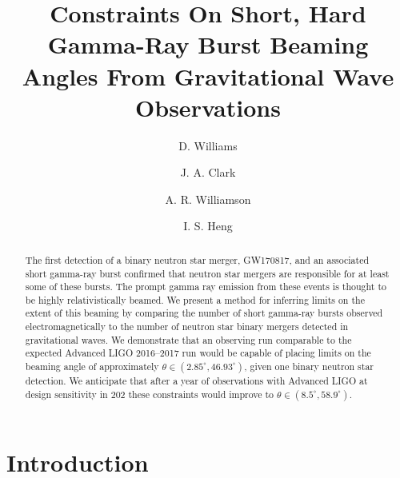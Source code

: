 \documentclass[twocolumn]{aastex61}
\begin{document}
\title{Constraints On Short, Hard Gamma-Ray Burst Beaming Angles From
Gravitational Wave Observations}

\author[0000-0003-3772-198X]{D. Williams}
\author[0000-0003-3243-1393]{J. A. Clark}
\author[0000-0002-7627-8688]{A. R. Williamson}
\author[0000-0002-1977-0019]{I. S. Heng}





\begin{abstract}
The first detection of a binary neutron star merger, GW170817, and an associated
short gamma-ray burst confirmed that neutron star mergers are responsible for at
least some of these bursts. The prompt gamma ray emission from these events is
thought to be highly relativistically beamed. We present a method for inferring
limits on the extent of this beaming by comparing the number of short gamma-ray
bursts observed electromagnetically to the number of neutron star binary mergers
detected in gravitational waves.
We demonstrate that an observing run comparable to the expected Advanced LIGO
2016--2017 run would be capable of placing limits on the beaming angle of
approximately $\theta \in (2.85^\circ,46.93^\circ)$, given one binary neutron
star detection.
We anticipate that after a year of observations with Advanced LIGO at design
sensitivity in 202 these constraints would improve to
$\theta \in (8.5^\circ,58.9^\circ)$. 
\end{abstract}


\section{Introduction}
\end{document}
